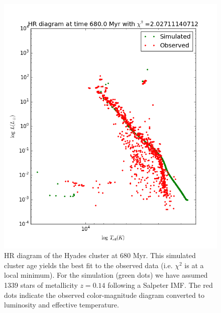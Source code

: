 \documentclass{aa}
\begin{document}
\begin{figure}
    \centering
    \includegraphics[width=\hsize]{img/test680.png}
    \caption{HR diagram of the Hyades cluster at 680 Myr. This simulated cluster age yields the best fit to the observed data (i.e. $\chi^2$ is at a local minimum). For the simulation (green dots) we have assumed 1339 stars of metallicity $z=0.14$ following a Salpeter IMF. The red dots indicate the observed color-magnitude diagram converted to luminosity and effective temperature.}\label{fig:bestfit}
\end{figure}
\end{document}
